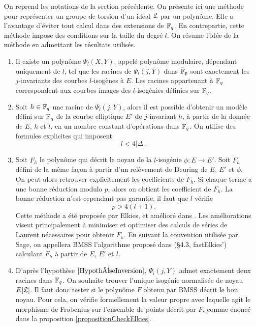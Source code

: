  On reprend les notations de la section précédente.
 On présente ici une méthode pour représenter un groupe de torsion d'un idéal $\mathfrak{L}$ par un polynôme. Elle a l'avantage d'éviter tout calcul dans des extensions de $\mathbb{F}_{q}$. En contrepartie, cette méthode impose des conditions sur la taille du degré $l$. On résume l'idée de la méthode en admettant les résultats utilisés.
\begin{enumerate}
	
	\item Il existe un polynôme $\Psi_{l}(X,Y)$, appelé polynôme modulaire, dépendant uniquement de $l$, tel que les racines de $\Psi_{l}(j,Y)$ dans $\bar{\mathbb{F}}_{p}$ sont exactement les $j$-invariants des courbes $l$-isogènes à $E$. Les racines appartenant à $\mathbb{F}_{q}$ correspondent aux courbes images des $l$-isogénies définies sur $\mathbb{F}_{q}$.
	
	\item Soit $h\in\mathbb{F}_{q}$ une racine de $\Psi_{l}(j,Y)$, alors il est possible d'obtenir un modèle défini sur $\mathbb{F}_{q}$ de la courbe elliptique $E'$ de $j$-invariant $h$, à partir de la donnée de $E$, $h$ et $l$, en un nombre constant d'opérations dans $\mathbb{F}_{q}$. On utilise des formules explicites qui imposent
	\begin{equation*}
		l < 4|\Delta|.
	\end{equation*}
	
	\item Soit $F_{h}$ le polynôme qui décrit le noyau de la $l$-isogénie $\phi: E\rightarrow E'$. Soit $\tilde{F}_{h}$ défini de la même façon à partir d'un relèvement de Deuring de $E$, $E'$ et $\phi$. On peut alors retrouver explicitement les coefficients de $\tilde{F}_{h}$. Si chaque terme a une bonne réduction modulo $p$, alors on obtient les coefficient de $F_{h}$. La bonne réduction n'est cependant pas garantie, il faut que $l$ vérifie
	\begin{equation*}
		p > 4(l+1).
	\end{equation*}
	Cette méthode a été proposée par Elkies, et amélioré dans \cite{Bostan_2008}. Les améliorations visent principalement à minimiser et optimiser des calculs de séries de Laurent nécessaires pour obtenir $\tilde{F}_{h}$. En suivant la convention utilisée par Sage, on appellera BMSS l'algorithme proposé dans \cite{Bostan_2008}(\S 4.3, fastElkies') calculant $F_{h}$ à partir de $E$, $E'$ et $l$.


	\item D'après l'hypothèse $\ref{HypothèseInversion}$, $\Psi_{l}(j,Y)$ admet exactement deux racines dans $\mathbb{F}_{q}$. On souhaite trouver l'unique isogénie normalisée de noyau $E[\mathfrak{L}]$. Il faut donc tester si le polynôme $F$ obtenu par BMSS décrit le bon noyau. Pour cela, on vérifie formellement la valeur propre avec laquelle agit le morphisme de Frobenius sur l'ensemble de points décrit par $F$, comme énoncé dans la proposition \ref{propositionCheckElkies}.

\end{enumerate}

